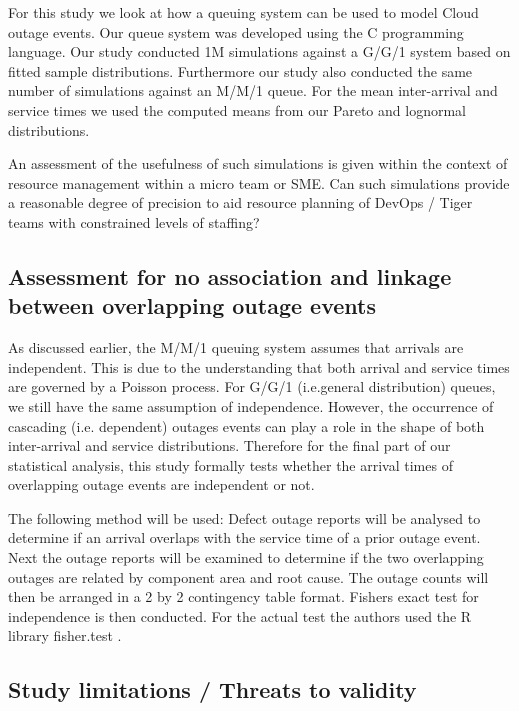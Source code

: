\documentclass[5p]{elsarticle}
\begin{document}
For this study we look at how a queuing system can be used to model Cloud outage events. Our queue system was developed using the C programming language. Our study conducted 1M simulations against a G/G/1 system based on fitted sample distributions. Furthermore our study also conducted the same number of simulations against an M/M/1 queue. For the mean inter-arrival and service times we used the computed means from our Pareto and lognormal distributions.

An assessment of the usefulness of such simulations is given within the context of resource management within a micro team or SME. Can such simulations provide a reasonable degree of precision to aid resource planning of DevOps / Tiger teams with constrained levels of staffing?

\subsection{Assessment for no association and linkage between overlapping outage events}

As discussed earlier, the M/M/1 queuing system assumes that arrivals are independent. This is due to the understanding that both arrival and service times are governed by a Poisson process. For G/G/1 (i.e.general distribution) queues, we still have the same assumption of independence. However, the occurrence of cascading (i.e. dependent) outages events can play a role in the shape of both inter-arrival and service distributions. Therefore for the final part of our statistical analysis, this study formally tests whether the arrival times of overlapping outage events are independent or not. 

The following method will be used: Defect outage reports will be analysed to determine if an arrival overlaps with the service time of a prior outage event. Next the outage reports will be examined to determine if the two overlapping outages are related by component area and root cause. The outage counts will then be arranged in a 2 by 2 contingency table format. Fishers exact test for independence\cite{fisher1922interpretation}\cite{fisher1925statistical} is then conducted. For the actual test the authors used the R library fisher.test \cite{FisherExact}. 

\subsection{Study limitations / Threats to validity}
\end{document}
